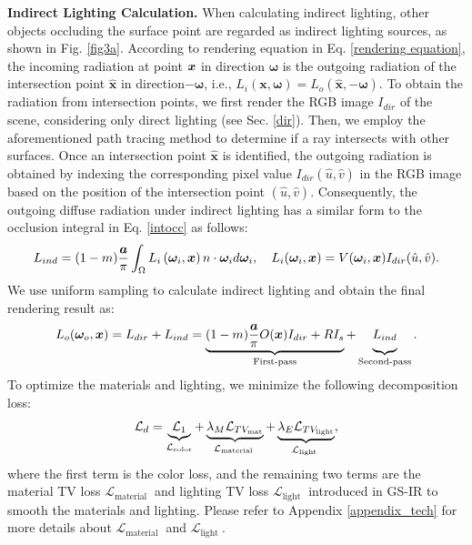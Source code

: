 \documentclass{article} %
\begin{document}
\textbf{Indirect Lighting Calculation.} When calculating indirect lighting, other objects occluding the surface point are regarded as indirect lighting sources, as shown in Fig. \ref{fig3a}. According to rendering equation in Eq. \ref{rendering equation}, the incoming radiation at point ${\bm{x}}$ in direction $\boldsymbol{\omega}$ is the outgoing radiation of the intersection point $\boldsymbol{\hat{x}}$ in direction$-\boldsymbol{\omega}$, i.e., $L_i(\boldsymbol{x},\boldsymbol{\omega}) = L_o(\boldsymbol{\hat{x}},-\boldsymbol{\omega})$.
To obtain the radiation from intersection points, we first render the RGB image $I_{dir}$ of the scene, considering only direct lighting (see Sec. \ref{dir}). Then, we employ the aforementioned path tracing method to determine if a ray intersects with other surfaces. Once an intersection point $\boldsymbol{\hat{x}}$ is identified, the outgoing radiation is obtained by indexing the corresponding pixel value $I_{dir}(\hat{u},\hat{v})$ in the RGB image based on the position of the intersection point $(\hat{u}, \hat{v})$. Consequently, the outgoing diffuse radiation under indirect lighting has a similar form to the occlusion integral in Eq. \ref{intocc} as follows:
\begin{equation}\label{L_ind}
\setlength\abovedisplayskip{2pt}
\setlength\belowdisplayskip{2pt}
    L_{ind}=(1-m) \frac{\boldsymbol{a}}{\pi} \int_{\Omega} L_i\left( \boldsymbol{\omega}_i, \vx \right) n\cdot\boldsymbol{\omega}_i d \boldsymbol{\omega}_i,\quad L_i(\boldsymbol{\omega}_i, \vx)=V( \boldsymbol{\omega}_i, \vx)I_{dir}(\hat{u},\hat{v}).
\end{equation}
We use uniform sampling to calculate indirect lighting and obtain the final rendering result as:
\begin{equation}\label{result}
\setlength\abovedisplayskip{3pt}
\setlength\belowdisplayskip{3pt}
    L_o(\boldsymbol{\omega}_o, \vx) = L_{dir} + L_{ind} = \underbrace{(1-m) \frac{\boldsymbol{a}}{\pi} O(\vx) I_{dir} + RI_s}_{\text {First-pass}} + \underbrace{\vphantom{\frac{\boldsymbol{a}}{\pi}} L_{ind}}_{\text {Second-pass}}.
\end{equation}
To optimize the materials and lighting, we minimize the following decomposition loss:
\begin{equation} 
\setlength\abovedisplayskip{3pt}
\setlength\belowdisplayskip{3pt}
\mathcal{L}_d=\underbrace{\mathcal{L}_1}_{\mathcal{L}_{\text {color}}}+\underbrace{\lambda_M \mathcal{L}_{TV_\text{mat}}}_{\mathcal{L}_{\text {material }}}+\underbrace{\lambda_E \mathcal{L}_{TV_\text{light}}}_{\mathcal{L}_{\text {light }}},
\end{equation}
where the first term is the color loss, and the remaining two terms are the material TV loss $\mathcal{L}_{\text {material }}$ and lighting TV loss $\mathcal{L}_{\text {light }}$ introduced in GS-IR \citep{gsir} to smooth the materials and lighting. Please refer to Appendix \ref{appendix_tech} for more details about $\mathcal{L}_{\text {material }}$ and $\mathcal{L}_{\text {light }}$.
\end{document}
